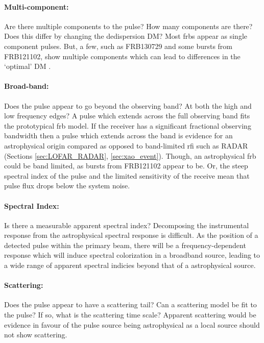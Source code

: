 \documentclass[a4paper,fleqn,usenatbib]{mnras}
\begin{document}
\paragraph{Multi-component:}

Are there multiple components to the pulse? How many components are there? Does
this differ by changing the dedispersion DM? Most \glspl{frb} appear as single
component pulses. But, a few, such as FRB130729 and some bursts from FRB121102,
show multiple components which can lead to differences in the `optimal' DM
\citep{2018Natur.553..182M}.

\paragraph{Broad-band:}

Does the pulse appear to go beyond the observing band? At both the high and low
frequency edges? A pulse which extends across the full observing band fits the
prototypical \gls{frb} model. If the receiver has a significant fractional
observing bandwidth then a pulse which extends across the band is evidence for
an astrophysical origin compared as opposed to band-limited \gls{rfi} such as
RADAR (Sections \ref{sec:LOFAR_RADAR}, \ref{sec:xao_event}). Though, an
astrophysical \gls{frb} could be band limited, as bursts from FRB121102 appear
to be. Or, the steep spectral index of the pulse and the limited sensitivity of
the receive mean that pulse flux drops below the system noise.

\paragraph{Spectral Index:}

Is there a measurable apparent spectral index? Decomposing the instrumental
response from the astrophysical spectral response is difficult.  As the position
of a detected pulse within the primary beam, there will be a frequency-dependent
response which will induce spectral colorization in a broadband source, leading
to a wide range of apparent spectral indicies beyond that of a astrophysical
source. 

\paragraph{Scattering:}

Does the pulse appear to have a scattering tail? Can a scattering model be fit
to the pulse? If so, what is the scattering time scale? Apparent scattering
would be evidence in favour of the pulse source being astrophysical as a local
source should not show scattering.
\end{document}

